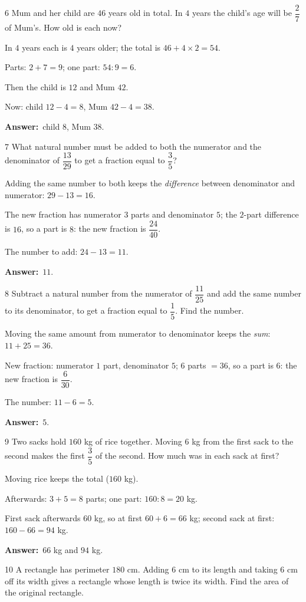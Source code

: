 \documentclass[11pt]{article}
\newif\ifsol \solfalse
\providecommand{\AnsWord}{Đáp số}
\newcommand{\dapso}[1]{\par\textbf{\AnsWord:}\ #1}
\newcommand{\probsol}[1]{%
  \begin{lrbox}{\solmeasure}\begin{minipage}{\dimexpr\linewidth-24pt\relax}#1\end{minipage}\end{lrbox}%
  \ifsol
    \begin{solbox}#1\end{solbox}%
  \else
    \setlength{\solht}{\dimexpr\ht\solmeasure+\dp\solmeasure+0.85cm\relax}%
    \ifdim\solht<1.35cm\setlength{\solht}{1.35cm}\fi
    \begin{tcolorbox}[colback=white,colframe=Line,boxrule=0.8pt,arc=5pt,
      left=8pt,right=8pt,top=4pt,bottom=4pt,height=\solht]{\footnotesize\color{Slate}\itshape\WorkWord}\end{tcolorbox}%
  \fi}
\newcommand{\gap}{\vspace{0.3cm}}
\def\WorkWord{Your work:}
\def\AnsWord{Answer}
\begin{document}
\gap
\begin{probbox}{6}{\relax}
Mum and her child are $46$ years old in total. In $4$ years the child's age will be $\dfrac27$ of Mum's. How old is each now?
\end{probbox}
\probsol{
In $4$ years each is $4$ years older; the total is $46+4\times2=54$.\par
Parts: $2+7=9$; one part: $54:9=6$.\par Then the child is $12$ and Mum $42$.\par
Now: child $12-4=8$, Mum $42-4=38$.
\dapso{child $8$, Mum $38$.}}
\gap
\begin{probbox}{7}{\relax}
What natural number must be added to both the numerator and the denominator of $\dfrac{13}{29}$ to get a fraction equal to $\dfrac35$?
\end{probbox}
\probsol{
Adding the same number to both keeps the \emph{difference} between denominator and numerator: $29-13=16$.\par
The new fraction has numerator $3$ parts and denominator $5$; the $2$-part difference is $16$, so a part is $8$: the new fraction is $\dfrac{24}{40}$.\par
The number to add: $24-13=11$.
\dapso{$11$.}}
\gap
\begin{probbox}{8}{\relax}
Subtract a natural number from the numerator of $\dfrac{11}{25}$ and add the same number to its denominator, to get a fraction equal to $\dfrac15$. Find the number.
\end{probbox}
\probsol{
Moving the same amount from numerator to denominator keeps the \emph{sum}: $11+25=36$.\par
New fraction: numerator $1$ part, denominator $5$; $6$ parts $=36$, so a part is $6$: the new fraction is $\dfrac6{30}$.\par
The number: $11-6=5$.
\dapso{$5$.}}
\gap
\begin{probbox}{9}{\relax}
Two sacks hold $160$ kg of rice together. Moving $6$ kg from the first sack to the second makes the first $\dfrac35$ of the second. How much was in each sack at first?
\end{probbox}
\probsol{
Moving rice keeps the total ($160$ kg).\par Afterwards: $3+5=8$ parts; one part: $160:8=20$ kg.\par
First sack afterwards $60$ kg, so at first $60+6=66$ kg; second sack at first: $160-66=94$ kg.
\dapso{$66$ kg and $94$ kg.}}
\gap
\begin{probbox}{10}{\relax}
A rectangle has perimeter $180$ cm. Adding $6$ cm to its length and taking $6$ cm off its width gives a rectangle whose length is twice its width. Find the area of the original rectangle.
\end{probbox}
\end{document}
